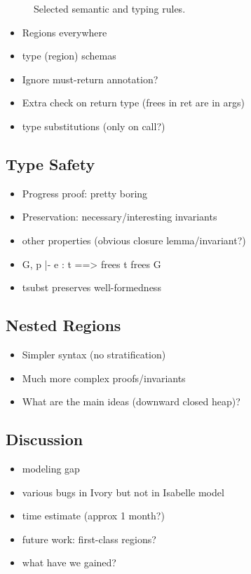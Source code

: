 \begin{figure*}[t]


\label{fig:rules}
\caption{Selected semantic and typing rules.}
\end{figure*}

\begin{itemize}
\item Regions everywhere
\item type (region) schemas
\item Ignore must-return annotation?
\item Extra check on return type (frees in ret are in args) 
\item type substitutions (only on call?)
\end{itemize}

\subsection{Type Safety}

\begin{itemize}
\item Progress proof: pretty boring
\item Preservation: necessary/interesting invariants
\item other properties (obvious closure lemma/invariant?)
\item G, p |- e : t ==> frees t \in frees G
\item tsubst preserves well-formedness
\end{itemize}

\subsection{Nested Regions}

\begin{itemize}
\item Simpler syntax (no stratification)
\item Much more complex proofs/invariants
\item What are the main ideas (downward closed heap)?
\end{itemize}

\subsection{Discussion}

\begin{itemize}
\item modeling gap
\item various bugs in Ivory but not in Isabelle model
\item time estimate (approx 1 month?)
\item future work: first-class regions?
\item what have we gained?
\end{itemize}











